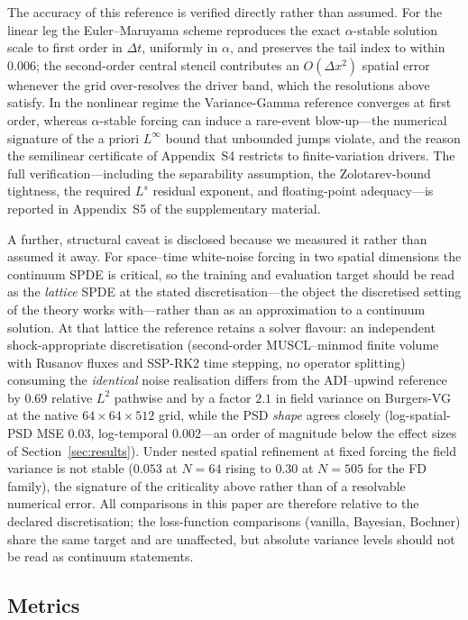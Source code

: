 \documentclass[review,12pt]{elsarticle}
\begin{document}
The accuracy of this reference is verified directly rather than
assumed. For the linear leg the Euler--Maruyama scheme reproduces the
exact $\alpha$-stable solution scale to first order in $\Delta t$,
uniformly in $\alpha$, and preserves the tail index to within $0.006$;
the second-order central stencil contributes an $O(\Delta x^2)$ spatial
error whenever the grid over-resolves the driver band, which the
resolutions above satisfy. In the nonlinear regime the Variance-Gamma
reference converges at first order, whereas $\alpha$-stable forcing can
induce a rare-event blow-up---the numerical signature of the a priori
$L^\infty$ bound that unbounded jumps violate, and the reason the
semilinear certificate of Appendix~S4 restricts to finite-variation
drivers. The full verification---including the separability assumption,
the Zolotarev-bound tightness, the required $L^s$ residual exponent, and
floating-point adequacy---is reported in Appendix~S5 of the
supplementary material.

A further, structural caveat is disclosed because we measured it rather
than assumed it away. For space--time white-noise forcing in two spatial
dimensions the continuum SPDE is critical, so the training and evaluation
target should be read as the \emph{lattice} SPDE at the stated
discretisation---the object the discretised setting of the theory works
with---rather than as an approximation to a continuum solution. At that
lattice the reference retains a solver flavour: an independent
shock-appropriate discretisation (second-order MUSCL--minmod finite
volume with Rusanov fluxes and SSP-RK2 time stepping, no operator
splitting) consuming the \emph{identical} noise realisation differs from
the ADI--upwind reference by $0.69$ relative $L^2$ pathwise and by a
factor $2.1$ in field variance on Burgers-VG at the native
$64\times64\times512$ grid, while the PSD \emph{shape} agrees closely
(log-spatial-PSD MSE $0.03$, log-temporal $0.002$---an order of magnitude
below the effect sizes of Section~\ref{sec:results}). Under nested
spatial refinement at fixed forcing the field variance is not stable
($0.053$ at $N{=}64$ rising to $0.30$ at $N{=}505$ for the FD family),
the signature of the criticality above rather than of a resolvable
numerical error. All comparisons in this paper are therefore relative to
the declared discretisation; the loss-function comparisons (vanilla,
Bayesian, Bochner) share the same target and are unaffected, but absolute
variance levels should not be read as continuum statements.

\subsection{Metrics}
\label{subsec:metrics}
\end{document}
